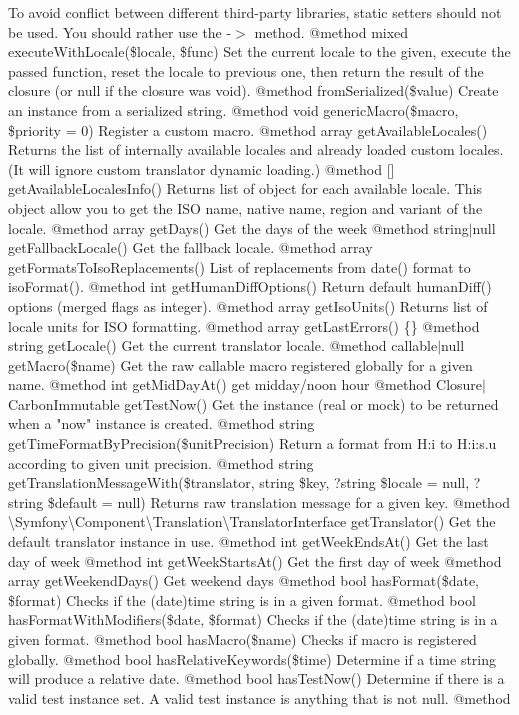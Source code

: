\begin{DoxyRefList}
To avoid conflict between different third-\/party libraries, static setters should not be used. You should rather use the -\/\texorpdfstring{$>$}{>} method. @method mixed execute\+With\+Locale(\$locale, \$func) Set the current locale to the given, execute the passed function, reset the locale to previous one, then return the result of the closure (or null if the closure was void). @method  from\+Serialized(\$value) Create an instance from a serialized string. @method void generic\+Macro(\$macro, \$priority = 0) Register a custom macro. @method array get\+Available\+Locales() Returns the list of internally available locales and already loaded custom locales. (It will ignore custom translator dynamic loading.) @method \mbox{[}\mbox{]} get\+Available\+Locales\+Info() Returns list of  object for each available locale. This object allow you to get the ISO name, native name, region and variant of the locale. @method array get\+Days() Get the days of the week @method string\texorpdfstring{$\vert$}{|}null get\+Fallback\+Locale() Get the fallback locale. @method array get\+Formats\+To\+Iso\+Replacements() List of replacements from date() format to iso\+Format(). @method int get\+Human\+Diff\+Options() Return default human\+Diff() options (merged flags as integer). @method array get\+Iso\+Units() Returns list of locale units for ISO formatting. @method array get\+Last\+Errors() \{\} @method string get\+Locale() Get the current translator locale. @method callable\texorpdfstring{$\vert$}{|}null get\+Macro(\$name) Get the raw callable macro registered globally for a given name. @method int get\+Mid\+Day\+At() get midday/noon hour @method Closure\texorpdfstring{$\vert$}{|}\+Carbon\+Immutable get\+Test\+Now() Get the  instance (real or mock) to be returned when a "{}now"{} instance is created. @method string get\+Time\+Format\+By\+Precision(\$unit\+Precision) Return a format from H\+:i to H\+:i\+:s.\+u according to given unit precision. @method string get\+Translation\+Message\+With(\$translator, string \$key, ?string \$locale = null, ?string \$default = null) Returns raw translation message for a given key. @method \textbackslash{}\+Symfony\textbackslash{}\+Component\textbackslash{}\+Translation\textbackslash{}\+Translator\+Interface get\+Translator() Get the default translator instance in use. @method int get\+Week\+Ends\+At() Get the last day of week @method int get\+Week\+Starts\+At() Get the first day of week @method array get\+Weekend\+Days() Get weekend days @method bool has\+Format(\$date, \$format) Checks if the (date)time string is in a given format. @method bool has\+Format\+With\+Modifiers(\$date, \$format) Checks if the (date)time string is in a given format. @method bool has\+Macro(\$name) Checks if macro is registered globally. @method bool has\+Relative\+Keywords(\$time) Determine if a time string will produce a relative date. @method bool has\+Test\+Now() Determine if there is a valid test instance set. A valid test instance is anything that is not null. @method 
\end{DoxyRefList}
